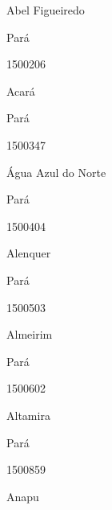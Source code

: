 \documentclass[
  letterpaper,
]{report}
\begin{document}
\n      

Abel Figueiredo

\n    

\n    

\n      

Pará

\n      

1500206

\n      

Acará

\n    

\n    

\n      

Pará

\n      

1500347

\n      

Água Azul do Norte

\n    

\n    

\n      

Pará

\n      

1500404

\n      

Alenquer

\n    

\n    

\n      

Pará

\n      

1500503

\n      

Almeirim

\n    

\n    

\n      

Pará

\n      

1500602

\n      

Altamira

\n    

\n    

\n      

Pará

\n      

1500859

\n      

Anapu

\n    

\n    

\n      
\end{document}
